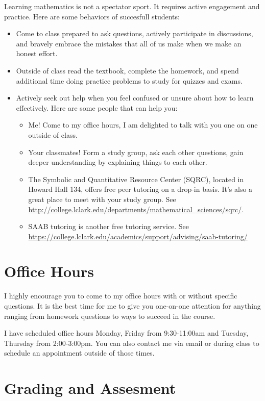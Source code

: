 \documentclass[11pt]{article}
\begin{document}
Learning mathematics is not a spectator sport. It requires active engagement and practice. Here are some behaviors of succesfull students:
\begin{itemize}
    \item Come to class prepared to ask questions, actively participate in discussions, and bravely embrace the mistakes that all of us make when we make an honest effort. 
    \item Outside of class read the textbook, complete the homework, and spend additional time doing practice problems to study for quizzes and exams.
    \item Actively seek out help when you feel confused or unsure about how to learn effectively. Here are some people that can help you:
    \begin{itemize}
        \item Me! Come to my office hours, I am delighted to talk with you one on one outside of class.
        \item Your classmates! Form a study group, ask each other questions, gain deeper understanding by explaining things to each other.
        \item The Symbolic and Quantitative Resource Center (SQRC), located in  Howard Hall 134, offers free peer tutoring on a drop-in basis. It's also a great place to meet with your study group. See \url{http://college.lclark.edu/departments/mathematical_sciences/sqrc/}.
        \item SAAB tutoring is another free tutoring service. See \url{https://college.lclark.edu/academics/support/advising/saab-tutoring/}
    \end{itemize}
\end{itemize}

\section*{Office Hours}

I highly encourage you to come to my office hours with or without specific questions. It is the best time for me to give you one-on-one attention for anything ranging from homework questions to ways to succeed in the course.

I have scheduled office hours Monday, Friday from 9:30-11:00am and Tuesday, Thursday from 2:00-3:00pm. You can also contact me via email or during class to schedule an appointment outside of those times.

\section*{Grading and Assesment}
\end{document}
